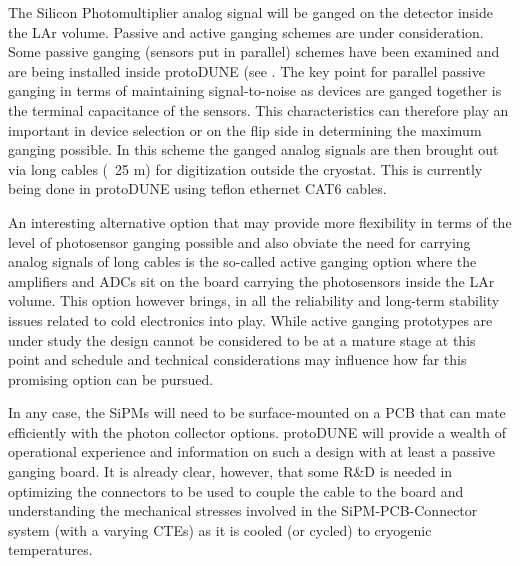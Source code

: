 The Silicon Photomultiplier analog signal will be ganged on the detector inside the
LAr volume. Passive and active ganging schemes are under consideration. Some passive
ganging (sensors put in parallel) schemes have been examined and are being installed inside
protoDUNE (see . The key point for parallel passive ganging in terms of 
maintaining signal-to-noise as devices are ganged together is the terminal capacitance of the 
sensors. This characteristics can therefore play an important in device selection or on
the flip side in determining the maximum ganging possible. In this scheme the 
ganged analog signals are then brought out via long cables (~25 m) for digitization outside
the cryostat. This is currently being done in protoDUNE using teflon ethernet CAT6 cables.

An interesting alternative option that may provide more flexibility in terms of the level of
photosensor ganging possible and also obviate the need for carrying analog signals of long cables
is the so-called active ganging option where the amplifiers and ADCs sit on the board carrying 
the photosensors inside the LAr volume. This option however brings, in all the reliability and long-term
stability issues related to cold electronics into play. While active ganging prototypes are under study 
the design cannot be considered to be at a mature stage at this point and schedule and technical
considerations may influence how far this promising option can be pursued.

In any case, the SiPMs will need to be surface-mounted on a PCB that can mate efficiently with the photon
collector options. protoDUNE will provide a wealth of operational experience and information on
such a design with at least a passive ganging board. It is already clear, however, that some R$\&$D is needed 
in optimizing the connectors to be used to couple the cable to the board and understanding the 
mechanical stresses involved in the SiPM-PCB-Connector system (with a varying CTEs) as it
is cooled (or cycled) to cryogenic temperatures.



